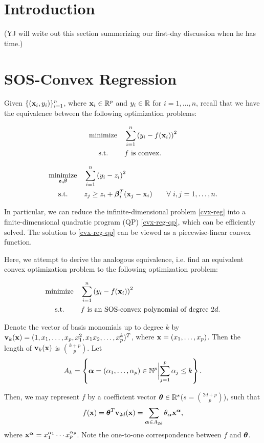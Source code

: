 \documentclass[11pt]{article}
\newcommand{\optprob}[5]
{
	\begin{equation}\label{#5}
	\begin{aligned}
	& \underset{#2}{\text{#1}}
	& & #3 \\
	& \text{\quad\ s.t.}
	& & #4
	\end{aligned}
	\end{equation}
}
\begin{document}

\section{Introduction}

(YJ will write out this section summerizing our first-day discussion when he has time.)

\clearpage

\section{SOS-Convex Regression}

Given $\{({\bf x}_i, y_i)\}_{i=1}^n$, where ${\bf x}_i \in {\mathbb R}^p$ and $y_i \in {\mathbb R}$ for $i = 1, \dotsc, n$, recall that we have the equivalence between the following optimization problems:

\optprob{minimize}{}{\sum_{i=1}^n\inparen{y_i - f(\bfx_i)}^2}{\text{$f$ is convex.}}{cvx-reg}

\optprob{minimize}{\bfz, \bfbeta}{\sum_{i=1}^n\inparen{y_i - z_i}^2}{z_j \geq z_i + \bfbeta_i^T(\bfx_j - \bfx_i) \qquad\forall\ i, j = 1, \dotsc, n.}{cvx-reg-qp}

In particular, we can reduce the infinite-dimensional problem \eqref{cvx-reg} into a finite-dimensional quadratic program (QP) \eqref{cvx-reg-qp}, which can be efficiently solved. The solution to \eqref{cvx-reg-qp} can be viewed as a piecewise-linear convex function. 

Here, we attempt to derive the analogous equivalence, i.e. find an equivalent convex optimization problem to the following optimization problem:
\optprob{minimize}{}{\sum_{i=1}^n\inparen{y_i - f(\bfx_i)}^2}{\text{$f$ is an SOS-convex polynomial of degree $2d$.}}{sos-reg}

Denote the vector of basis monomials up to degree $k$ by ${\bf v}_k({\bf x}) = (1, x_1, \dotsc, x_p, x_1^2, x_1x_2, \dotsc, x_p^k)^T$, where ${\bf x} = (x_1, \dotsc, x_p)$. Then the length of ${\bf v}_k({\bf x})$ is ${k + p \choose p}$. Let
$$A_k = \left\{ {\boldsymbol\alpha} = (\alpha_1, \dotsc, \alpha_p) \in {\mathbb{N}}^p \biggl| \sum_{j=1}^p \alpha_j \leq k \right\}.$$

Then, we may represent $f$ by a coefficient vector ${\boldsymbol\theta} \in {\mathbb R}^s$($s = {2d + p \choose p}$), such that
\[
f({\bf x}) = {\boldsymbol\theta}^T{\bf v}_{2d}({\bf x}) = \sum_{{\boldsymbol\alpha} \in A_{2d}} \theta_{\boldsymbol\alpha} {\bf x}^{\boldsymbol\alpha},
\]
where ${\bf x}^{\boldsymbol\alpha} = x_1^{\alpha_1}\cdots x_p^{\alpha_p}$. Note the one-to-one correspondence between $f$ and ${\boldsymbol\theta}$.
\end{document}
